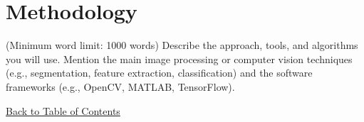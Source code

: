 \section{Methodology}
(Minimum word limit: 1000 words)
Describe the approach, tools, and algorithms you will use.  
Mention the main image processing or computer vision techniques (e.g., segmentation, feature extraction, classification) and the software frameworks (e.g., OpenCV, MATLAB, TensorFlow).

\hyperref[contents]{\small Back to Table of Contents}
\newpage
